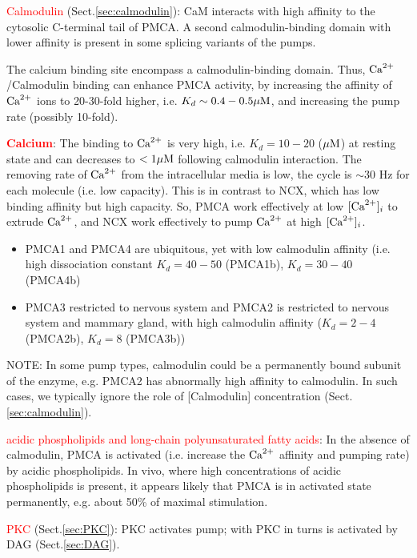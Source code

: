 \textcolor{red}{Calmodulin} (Sect.\ref{sec:calmodulin}): CaM interacts with high
affinity to the cytosolic C-terminal tail of PMCA.  A second calmodulin-binding
domain with lower affinity is present in some splicing variants of the pumps.

The calcium binding site
encompass a calmodulin-binding domain.
Thus, ${\text{Ca}^{2+}}$/Calmodulin binding can enhance PMCA activity, by increasing the affinity
of ${\text{Ca}^{2+}}$ ions to 20-30-fold higher, i.e. $K_d \sim 0.4-0.5 {\mu\text{M}}$, and increasing
the pump rate (possibly 10-fold).

\textcolor{red}{\bf Calcium}: 
The binding to ${\text{Ca}^{2+}}$ is very high, i.e. $K_d = 10-20$ (${\mu\text{M}}$) at resting state
and can decreases to $< 1 {\mu\text{M}}$ following calmodulin interaction. The removing
rate of ${\text{Ca}^{2+}}$ from the intracellular media is low, the cycle is $\sim 30$ Hz for
each molecule (i.e. low capacity). This is in contrast to NCX, which has low
binding affinity but high capacity. So, PMCA work effectively at low $[{\text{Ca}^{2+}}]_i$
to extrude ${\text{Ca}^{2+}}$, and NCX work effectively to pump ${\text{Ca}^{2+}}$ at high $[{\text{Ca}^{2+}}]_i$.

\begin{itemize}
  
\item PMCA1 and PMCA4 are ubiquitous, yet with low calmodulin affinity
  (i.e. high dissociation constant $K_d=40-50$ (PMCA1b), $K_d=30-40$ (PMCA4b)

\item PMCA3 restricted to nervous system and PMCA2 is restricted to
  nervous system and mammary gland, with high calmodulin affinity
  ($K_d=2-4$ (PMCA2b), $K_d=8$ (PMCA3b))
\end{itemize}
NOTE: In some pump types, calmodulin could be a permanently bound subunit of the
enzyme, e.g. PMCA2 has abnormally high affinity to calmodulin. In such cases,
we typically ignore the role of [Calmodulin] concentration
(Sect.\ref{sec:calmodulin}).

\textcolor{red}{acidic phospholipids and long-chain polyunsaturated fatty
acids}: In the absence of calmodulin, PMCA is activated (i.e. increase the ${\text{Ca}^{2+}}$
affinity and pumping rate) by acidic phospholipids. In vivo, 
where high concentrations of acidic phospholipids is present, it appears
likely that PMCA is in activated state permanently, e.g. about 50\%
of maximal stimulation. 

\textcolor{red}{PKC} (Sect.\ref{sec:PKC}): PKC activates pump;  with PKC in
turns is activated by DAG (Sect.\ref{sec:DAG}).


